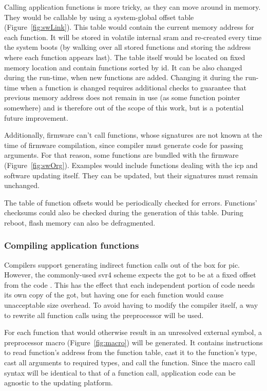 Calling application functions is more tricky, as they can move around in memory. They would be callable by using a system-global offset table (Figure~\ref{fig:swLink}). This table would contain the current memory address for each function. It will be stored in volatile internal \gls{sram} and re-created every time the system boots (by walking over all stored functions and storing the address where each function appears last). The table itself would be located on fixed memory location and contain functions sorted by id. It can be also changed during the run-time, when new functions are added. Changing it during the run-time when a function is changed requires additional checks to guarantee that previous memory address does not remain in use (as some function pointer somewhere) and is therefore out of the scope of this work, but is a potential future improvement.

Additionally, firmware can't call functions, whose signatures are not known at the time of firmware compilation, since compiler must generate code for passing arguments. For that reason, some functions are bundled with the firmware (Figure~\ref{fig:swOrg}). Examples would include functions dealing with the \gls{icp} and software updating itself. They can be updated, but their signatures must remain unchanged.

The table of function offsets would be periodically checked for errors. Functions' checksums could also be checked during the generation of this table. During reboot, flash memory can also be defragmented.

\subsubsection{Compiling application functions}

Compilers support generating indirect function calls out of the box for \gls{pic}. However, the commonly-used \gls{svr4} scheme expects the \gls{got} to be at a fixed offset from the code \cite[Chapter~8]{Levine1999}. This has the effect that each independent portion of code needs its own copy of the \gls{got}, but having one for each function would cause unacceptable size overhead. To avoid having to modify the compiler itself, a way to rewrite all function calls using the preprocessor will be used.

For each function that would otherwise result in an unresolved external symbol, a preprocessor macro (Figure~\ref{fig:macro}) will be generated. It contains instructions to read function's address from the function table, cast it to the function's type, cast all arguments to required types, and call the function. Since the macro call syntax will be identical to that of a function call, application code can be agnostic to the updating platform.

